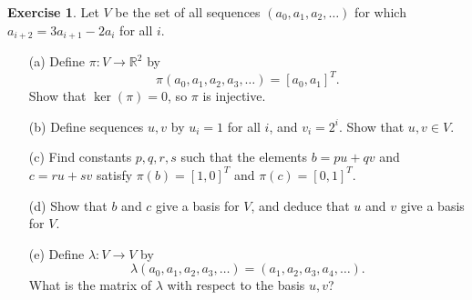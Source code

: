 \documentclass{amsart}
\newcommand{\R}         {{\mathbb{R}}}
\newcommand{\lm}        {\lambda}
\newcommand{\xra}       {\xrightarrow}
\renewcommand{\:}       {\colon}
\theoremstyle{definition}
\newtheorem{exercise}{Exercise}[section]
\begin{document}
\begin{exercise}
 Let $V$ be the set of all sequences $(a_0,a_1,a_2,\dotsc)$ for
 which $a_{i+2}=3a_{i+1}-2a_i$ for all $i$.
 \begin{itemize}
  \item[(a)] Define $\pi\:V\to\R^2$ by
   \[ \pi(a_0,a_1,a_2,a_3,\dotsc) = [a_0,a_1]^T. \]
   Show that $\ker(\pi)=0$, so $\pi$ is injective.
  \item[(b)] Define sequences $u,v$ by $u_i=1$ for all $i$, and
  $v_i=2^i$.  Show that $u,v\in V$.
  \item[(c)] Find constants $p,q,r,s$ such that the elements
  $b=pu+qv$ and $c=ru+sv$ satisfy $\pi(b)=[1,0]^T$ and
  $\pi(c)=[0,1]^T$.
  \item[(d)] Show that $b$ and $c$ give a basis for $V$, and
   deduce that $u$ and $v$ give a basis for $V$.
  \item[(e)] Define $\lm\:V\xra{}V$ by
   \[ \lm(a_0,a_1,a_2,a_3,\dotsc) =
         (a_1,a_2,a_3,a_4,\dotsc).
   \]
   What is the matrix of $\lm$ with respect to the basis $u,v$?
 \end{itemize}
\end{exercise}
\end{document}

